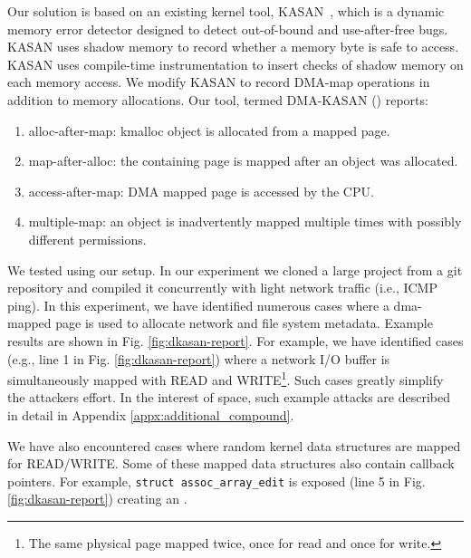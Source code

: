 Our solution is based on an existing kernel tool, KASAN~\cite{kasan}, which is a dynamic memory error detector designed to detect out-of-bound and use-after-free bugs. KASAN uses shadow memory to record whether a memory byte is safe to access. KASAN uses compile-time instrumentation to insert checks of shadow memory on each memory access. 
We modify KASAN to record DMA-map operations in addition to memory allocations. Our tool, termed DMA-KASAN (\dkasan) reports: 
\begin{enumerate}
    \item alloc-after-map:  kmalloc object is allocated from a mapped page.
    \item map-after-alloc:  the containing page is mapped after an object was allocated.
    \item access-after-map: DMA mapped page is accessed by the CPU.
    \item multiple-map: an object is inadvertently mapped multiple times with possibly different permissions.
\end{enumerate}
We tested \dkasan using our setup. In our experiment we cloned a large project from a git repository and compiled it concurrently with light network traffic (i.e., ICMP ping). In this experiment, we have identified numerous cases where a dma-mapped page is used to allocate network and file system metadata. Example results are shown in Fig. \ref{fig:dkasan-report}. 
For example, we have identified cases (e.g., line 1 in Fig. \ref{fig:dkasan-report}) where a network I/O buffer is simultaneously mapped with READ and WRITE\footnote{The same physical page mapped twice, once for read and once for write.}. Such cases greatly simplify the attackers effort. In the interest of space, such example attacks are described in detail in Appendix \ref{appx:additional_compound}. 

We have also encountered cases where random kernel data structures are mapped for READ/WRITE. Some of these mapped data structures also contain callback pointers. For example, \texttt{struct assoc\_array\_edit} is exposed (line 5 in Fig. \ref{fig:dkasan-report}) creating an \oportunity. 
%
